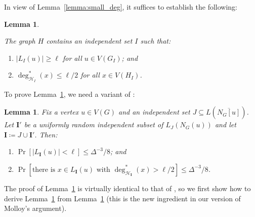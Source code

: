 \documentclass[11pt, reqno, psamsfonts]{amsart}
\newtheorem{lemma}[theo]{Lemma}
\theoremstyle{definition}
\theoremstyle{remark}
\newcommand{\0}{\varnothing}
\renewcommand{\leq}{\leqslant}
\renewcommand{\geq}{\geqslant}
\newcommand{\defeq}{\coloneqq}
\newcommand{\Cov}[1]{\mathscr{#1}}
\renewcommand{\mathbf}[1]{{\bm{#1}}}
\numberwithin{equation}{section}
\begin{document}
	In view of Lemma~\ref{lemma:small_deg}, it suffices to establish the following:
	
	\begin{lemma}\label{lemma:main}
		\begin{samepage}The graph $H$ contains an independent set $I$ such that:
		\begin{enumerate}[label=\normalfont{(\roman*)}]
			\item $|L_I(u)| \geq \ell$ for all $u \in V(G_I)$; and
			\item $\deg_{\Cov{H}_I}^\ast(x) \leq \ell/2$ for all $x \in V(H_I)$.
		\end{enumerate}
		\end{samepage}
	\end{lemma}
	
	To prove Lemma~\ref{lemma:main}, we need a variant of \cite[Lemma~7]{Mol17}:
	
	\begin{lemma}\label{lemma:conc}
		Fix a vertex $u \in V(G)$ and an independent set $J\subseteq L(\overline{N_G[u]})$. Let $\mathbf{I}'$ be a uniformly random independent subset of $L_J(N_G(u))$ and let $\mathbf{I} \defeq J \cup \mathbf{I}'$. Then:
		\begin{enumerate}[label=\normalfont{(\emph{\alph*})}]
			\item\label{item:a} $\Pr\left[|L_\mathbf{I}(u)| < \ell\right] \leq \Delta^{-3}/8$; and
			\item\label{item:b} $\Pr\left[\text{there is } x \in L_\mathbf{I}(u) \text{ with } \deg^\ast_{\Cov{H}_{\mathbf{I}}}(x) > \ell/2\right] \leq \Delta^{-3}/8$.
		\end{enumerate}
	\end{lemma}
	
	The proof of Lemma~\ref{lemma:conc} is virtually identical to that of \cite[Lemma~7]{Mol17}, so we first show how to derive Lemma~\ref{lemma:main} from Lemma~\ref{lemma:conc} (this is the new ingredient in our version of Molloy's argument).
	
\end{document}
